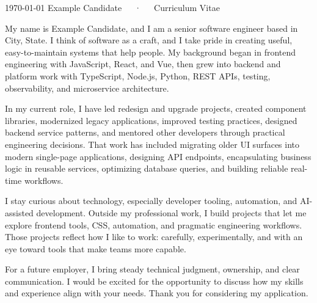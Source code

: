 \documentclass[11pt, letterpaper]{../getkan-cv}
\begin{document}
\makecvheader[C]

\makecvfooter
{\today}
{Example Candidate~~~·~~~Curriculum Vitae}
{\thepage}


\makelettertitle

\begin{cvletter}
    My name is Example Candidate, and I am a senior software engineer based in City, State. I think of software as a craft, and I take pride in creating useful, easy-to-maintain systems that help people. My background began in frontend engineering with JavaScript, React, and Vue, then grew into backend and platform work with TypeScript, Node.js, Python, REST APIs, testing, observability, and microservice architecture.

    In my current role, I have led redesign and upgrade projects, created component libraries, modernized legacy applications, improved testing practices, designed backend service patterns, and mentored other developers through practical engineering decisions. That work has included migrating older UI surfaces into modern single-page applications, designing API endpoints, encapsulating business logic in reusable services, optimizing database queries, and building reliable real-time workflows.

    I stay curious about technology, especially developer tooling, automation, and AI-assisted development. Outside my professional work, I build projects that let me explore frontend tools, CSS, automation, and pragmatic engineering workflows. Those projects reflect how I like to work: carefully, experimentally, and with an eye toward tools that make teams more capable.

    For a future employer, I bring steady technical judgment, ownership, and clear communication. I would be excited for the opportunity to discuss how my skills and experience align with your needs. Thank you for considering my application.
\end{cvletter}

\makeletterclosing


\end{document}
